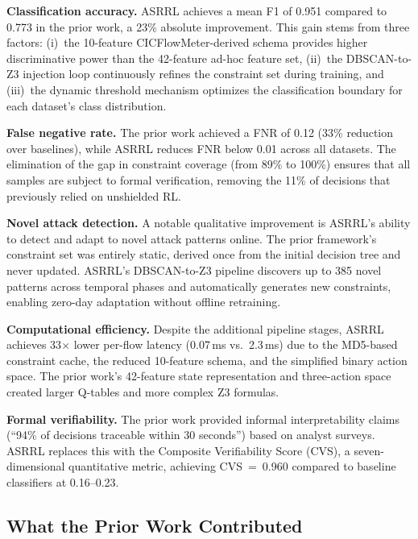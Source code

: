\documentclass[12pt, letterpaper, oneside]{report}
\newcommand{\ASRRL}{\textsc{ASRRL}}
\begin{document}
\textbf{Classification accuracy.} \ASRRL{} achieves a mean F1 of 0.951 compared to 0.773 in the prior work, a 23\% absolute improvement. This gain stems from three factors: (i)~the 10-feature CICFlowMeter-derived schema provides higher discriminative power than the 42-feature ad-hoc feature set, (ii)~the DBSCAN-to-Z3 injection loop continuously refines the constraint set during training, and (iii)~the dynamic threshold mechanism optimizes the classification boundary for each dataset's class distribution.

\textbf{False negative rate.} The prior work achieved a FNR of 0.12 (33\% reduction over baselines), while \ASRRL{} reduces FNR below 0.01 across all datasets. The elimination of the gap in constraint coverage (from 89\% to 100\%) ensures that all samples are subject to formal verification, removing the 11\% of decisions that previously relied on unshielded RL.

\textbf{Novel attack detection.} A notable qualitative improvement is \ASRRL{}'s ability to detect and adapt to novel attack patterns online. The prior framework's constraint set was entirely static, derived once from the initial decision tree and never updated. \ASRRL{}'s DBSCAN-to-Z3 pipeline discovers up to 385 novel patterns across temporal phases and automatically generates new constraints, enabling zero-day adaptation without offline retraining.

\textbf{Computational efficiency.} Despite the additional pipeline stages, \ASRRL{} achieves 33$\times$ lower per-flow latency (0.07\,ms vs.\ 2.3\,ms) due to the MD5-based constraint cache, the reduced 10-feature schema, and the simplified binary action space. The prior work's 42-feature state representation and three-action space created larger Q-tables and more complex Z3 formulas.

\textbf{Formal verifiability.} The prior work provided informal interpretability claims (``94\% of decisions traceable within 30 seconds'') based on analyst surveys. \ASRRL{} replaces this with the Composite Verifiability Score (CVS), a seven-dimensional quantitative metric, achieving CVS~=~0.960 compared to baseline classifiers at 0.16--0.23.

\subsection{What the Prior Work Contributed}
\end{document}

